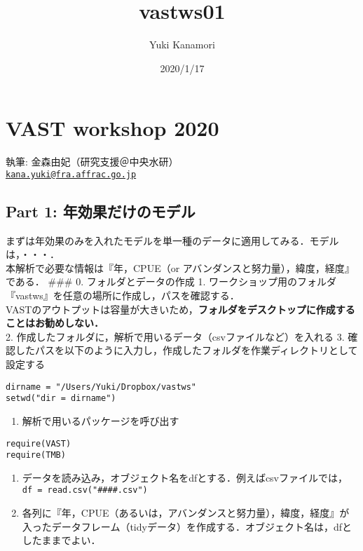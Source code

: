 \documentclass[]{article}
\title{vastws01}
\author{Yuki Kanamori}
\date{2020/1/17}
\providecommand{\tightlist}{%
  \setlength{\itemsep}{0pt}\setlength{\parskip}{0pt}}
\begin{document}
\maketitle

\hypertarget{vast-workshop-2020}{%
\section{VAST workshop 2020}\label{vast-workshop-2020}}

執筆: 金森由妃（研究支援＠中央水研）\\
\href{mailto:kana.yuki@fra.affrac.go.jp}{\nolinkurl{kana.yuki@fra.affrac.go.jp}}

\hypertarget{part-1-ux5e74ux52b9ux679cux3060ux3051ux306eux30e2ux30c7ux30eb}{%
\subsection{Part 1:
年効果だけのモデル}\label{part-1-ux5e74ux52b9ux679cux3060ux3051ux306eux30e2ux30c7ux30eb}}

まずは年効果のみを入れたモデルを単一種のデータに適用してみる．モデルは，・・・．\\
本解析で必要な情報は『年，CPUE（or
アバンダンスと努力量），緯度，経度』である． \#\#\# 0.
フォルダとデータの作成 1.
ワークショップ用のフォルダ『vastws』を任意の場所に作成し，パスを確認する．\\
VASTのアウトプットは容量が大きいため，\textbf{フォルダをデスクトップに作成することはお勧めしない．}\\
2. 作成したフォルダに，解析で用いるデータ（csvファイルなど）を入れる 3.
確認したパスを以下のように入力し，作成したフォルダを作業ディレクトリとして設定する

\begin{verbatim}
dirname = "/Users/Yuki/Dropbox/vastws"    
setwd("dir = dirname")
\end{verbatim}

\begin{enumerate}
\def\labelenumi{\arabic{enumi}.}
\setcounter{enumi}{3}
\tightlist
\item
  解析で用いるパッケージを呼び出す
\end{enumerate}

\begin{verbatim}
require(VAST)
require(TMB)
\end{verbatim}

\begin{enumerate}
\def\labelenumi{\arabic{enumi}.}
\setcounter{enumi}{4}
\tightlist
\item
  データを読み込み，オブジェクト名をdfとする．例えばcsvファイルでは，
  \texttt{df\ =\ read.csv("\#\#\#\#.csv")}
\item
  各列に『年，CPUE（あるいは，アバンダンスと努力量），緯度，経度』が入ったデータフレーム（tidyデータ）を作成する．オブジェクト名は，dfとしたままでよい．
\end{enumerate}
\end{document}
